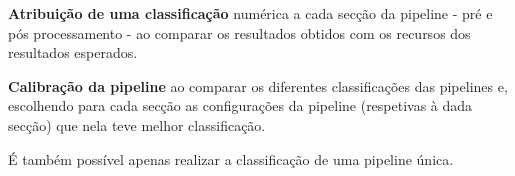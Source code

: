 \textbf{Atribuição de uma classificação} numérica a cada secção da pipeline - pré e pós processamento - ao comparar os resultados obtidos com os recursos dos resultados esperados. 

\textbf{Calibração da pipeline} ao comparar os diferentes classificações das pipelines e, escolhendo para cada secção as configurações da pipeline (respetivas à dada secção) que nela teve melhor classificação.

É também possível apenas realizar a classificação de uma pipeline única.










